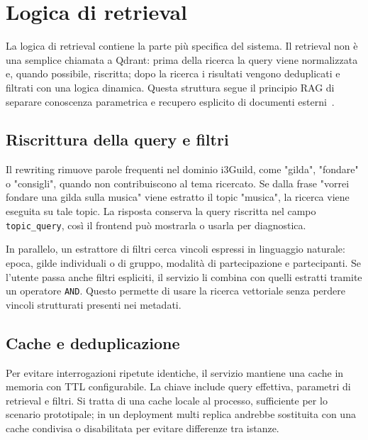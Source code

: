 \section{Logica di retrieval}
\label{sec:implementation_retrieval_logic}

La logica di retrieval contiene la parte più specifica del sistema. Il retrieval
non è una semplice chiamata a Qdrant: prima della ricerca la query viene
normalizzata e, quando possibile, riscritta; dopo la ricerca i risultati vengono
deduplicati e filtrati con una logica dinamica. Questa struttura segue il
principio RAG di separare conoscenza parametrica e recupero esplicito di
documenti esterni~\cite{lewis2020retrieval}.

\subsection{Riscrittura della query e filtri}
\label{subsec:implementation_query_rewriting}

Il rewriting rimuove parole frequenti nel dominio i3Guild, come "gilda",
"fondare" o "consigli", quando non contribuiscono al tema ricercato. Se dalla
frase "vorrei fondare una gilda sulla musica" viene estratto il topic
"musica", la ricerca viene eseguita su tale topic. La risposta conserva la query
riscritta nel campo \texttt{topic\_query}, così il frontend può mostrarla o
usarla per diagnostica.

In parallelo, un estrattore di filtri cerca vincoli espressi in linguaggio
naturale: epoca, gilde individuali o di gruppo, modalità di
partecipazione e partecipanti. Se l'utente passa anche filtri espliciti, il
servizio li combina con quelli estratti tramite un operatore \texttt{AND}. Questo
permette di usare la ricerca vettoriale senza perdere vincoli strutturati
presenti nei metadati.

\subsection{Cache e deduplicazione}
\label{subsec:implementation_cache_dedupe}

Per evitare interrogazioni ripetute identiche, il servizio mantiene una cache in
memoria con TTL configurabile. La chiave include query effettiva, parametri di
retrieval e filtri. Si tratta di una cache locale al processo, sufficiente per
lo scenario prototipale; in un deployment multi replica andrebbe sostituita con
una cache condivisa o disabilitata per evitare differenze tra istanze.

